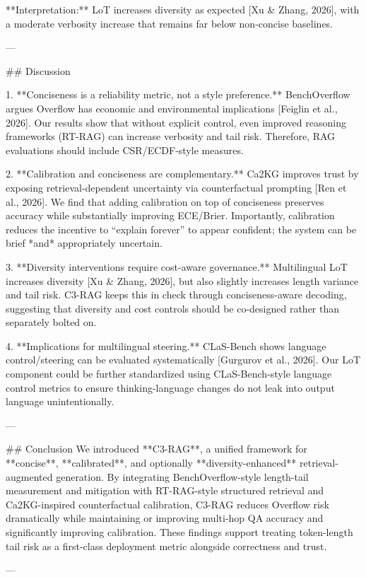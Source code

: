 **Interpretation:** LoT increases diversity as expected [Xu & Zhang, 2026], with a moderate verbosity increase that remains far below non-concise baselines.

---

## Discussion  

1. **Conciseness is a reliability metric, not a style preference.** BenchOverflow argues Overflow has economic and environmental implications [Feiglin et al., 2026]. Our results show that without explicit control, even improved reasoning frameworks (RT-RAG) can increase verbosity and tail risk. Therefore, RAG evaluations should include CSR/ECDF-style measures.

2. **Calibration and conciseness are complementary.** Ca2KG improves trust by exposing retrieval-dependent uncertainty via counterfactual prompting [Ren et al., 2026]. We find that adding calibration on top of conciseness preserves accuracy while substantially improving ECE/Brier. Importantly, calibration reduces the incentive to “explain forever” to appear confident; the system can be brief *and* appropriately uncertain.

3. **Diversity interventions require cost-aware governance.** Multilingual LoT increases diversity [Xu & Zhang, 2026], but also slightly increases length variance and tail risk. C3-RAG keeps this in check through conciseness-aware decoding, suggesting that diversity and cost controls should be co-designed rather than separately bolted on.

4. **Implications for multilingual steering.** CLaS-Bench shows language control/steering can be evaluated systematically [Gurgurov et al., 2026]. Our LoT component could be further standardized using CLaS-Bench-style language control metrics to ensure thinking-language changes do not leak into output language unintentionally.

---

## Conclusion  
We introduced **C3-RAG**, a unified framework for **concise**, **calibrated**, and optionally **diversity-enhanced** retrieval-augmented generation. By integrating BenchOverflow-style length-tail measurement and mitigation with RT-RAG-style structured retrieval and Ca2KG-inspired counterfactual calibration, C3-RAG reduces Overflow risk dramatically while maintaining or improving multi-hop QA accuracy and significantly improving calibration. These findings support treating token-length tail risk as a first-class deployment metric alongside correctness and trust.

---

